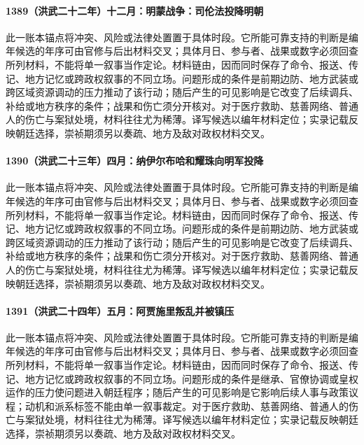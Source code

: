 \paragraph{1389（洪武二十二年）十二月：明蒙战争：司伦法投降明朝} 此一账本锚点将冲突、风险或法律处置置于具体时段。它所能可靠支持的判断是编年候选的年序可由官修与后出材料交叉；具体月日、参与者、战果或数字必须回查所列材料，不能将单一叙事当作定论。材料链由，因而同时保存了命令、报送、传记、地方记忆或跨政权叙事的不同立场。问题形成的条件是前期边防、地方武装或跨区域资源调动的压力推动了该行动；随后产生的可见影响是它改变了后续调兵、补给或地方秩序的条件；战果和伤亡须分开核对。对于医疗救助、慈善网络、普通人的伤亡与案狱处境，材料往往尤为稀薄。译写候选以编年材料定位；实录记载反映朝廷选择，崇祯期须另以奏疏、地方及敌对政权材料交叉。

\paragraph{1390（洪武二十三年）四月：纳伊尔布哈和耀珠向明军投降} 此一账本锚点将冲突、风险或法律处置置于具体时段。它所能可靠支持的判断是编年候选的年序可由官修与后出材料交叉；具体月日、参与者、战果或数字必须回查所列材料，不能将单一叙事当作定论。材料链由，因而同时保存了命令、报送、传记、地方记忆或跨政权叙事的不同立场。问题形成的条件是前期边防、地方武装或跨区域资源调动的压力推动了该行动；随后产生的可见影响是它改变了后续调兵、补给或地方秩序的条件；战果和伤亡须分开核对。对于医疗救助、慈善网络、普通人的伤亡与案狱处境，材料往往尤为稀薄。译写候选以编年材料定位；实录记载反映朝廷选择，崇祯期须另以奏疏、地方及敌对政权材料交叉。

\paragraph{1391（洪武二十四年）五月：阿贾施里叛乱并被镇压} 此一账本锚点将冲突、风险或法律处置置于具体时段。它所能可靠支持的判断是编年候选的年序可由官修与后出材料交叉；具体月日、参与者、战果或数字必须回查所列材料，不能将单一叙事当作定论。材料链由，因而同时保存了命令、报送、传记、地方记忆或跨政权叙事的不同立场。问题形成的条件是继承、官僚协调或皇权运作的压力使问题进入朝廷程序；随后产生的可见影响是它影响后续人事与政策议程；动机和派系标签不能由单一叙事裁定。对于医疗救助、慈善网络、普通人的伤亡与案狱处境，材料往往尤为稀薄。译写候选以编年材料定位；实录记载反映朝廷选择，崇祯期须另以奏疏、地方及敌对政权材料交叉。

